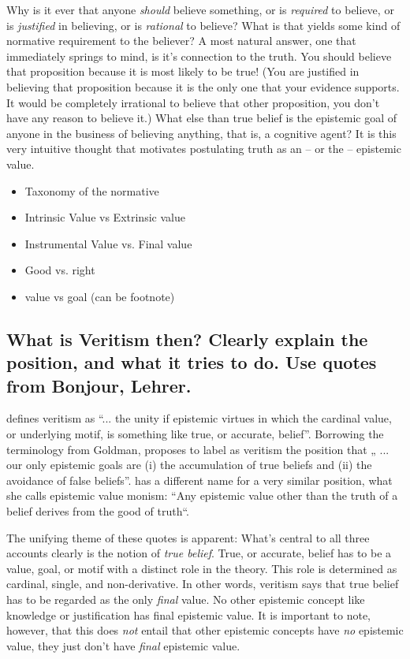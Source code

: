 \documentclass[12pt,numbers=noenddot]{scrartcl}
\begin{document}
Why is it ever that anyone \emph{should} believe something, or is \emph{required} to believe, or is \emph{justified} in believing, or is \emph{rational} to believe? What is that yields some kind of normative requirement to the believer? A most natural answer, one that immediately springs to mind, is it's connection to the truth. You should believe that proposition because it is most likely to be true! (You are justified in believing that proposition because it is the only one that your evidence supports. It would be completely irrational to believe that other proposition, you don't have any reason to believe it.) What else than true belief is the epistemic goal of anyone in the business of believing anything, that is, a cognitive agent? It is this very intuitive thought that motivates postulating truth as an -- or the -- epistemic value.
\begin{itemize}
    \item Taxonomy of the normative
    \item Intrinsic Value vs Extrinsic value 
    \item Instrumental Value vs. Final value 
    \item Good vs. right 
    \item value vs goal (can be footnote)
\end{itemize}

\subsection{What is Veritism then? Clearly explain the position, and what it tries to do. Use quotes from Bonjour, Lehrer.}

\textcite[54]{Goldman2002-GOLTUO-2} defines veritism as  “... the unity if epistemic virtues in which the cardinal value, or underlying motif, is something like true, or accurate, belief”. Borrowing the terminology from Goldman, \textcite[360]{Berker2013-BERETA-2} proposes to label as veritism the position that „ ... our only epistemic goals are (i) the accumulation of true beliefs and (ii) the avoidance of false beliefs”. \textcite{Zagzebski2004-ZAGEVM-2} has a different name for a very similar position, what she calls epistemic value monism: “Any epistemic value other than the truth of a belief derives from the good of truth“.

The unifying theme of these quotes is apparent: What’s central to all three accounts clearly is the notion of \emph{true belief}. True, or accurate, belief has to be a value, goal, or motif with a distinct role in the theory. This role is determined as cardinal, single, and non-derivative. In other words, veritism says that true belief has to be regarded as the only \emph{final} value. No other epistemic concept like knowledge or justification has final epistemic value. It is important to note, however, that this does \emph{not} entail that other epistemic concepts have \emph{no} epistemic value, they just don’t have \emph{final} epistemic value.
\end{document}
